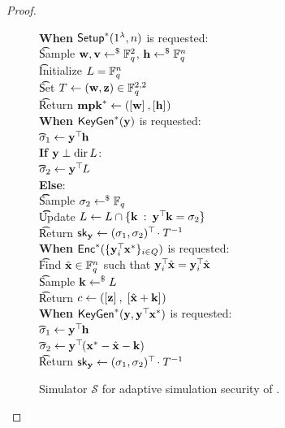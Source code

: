 \begin{proof}
	\begin{figure}[htb]
	\centering
	\begin{pcvstack}
		{
			\textbf{When} $\mathsf{Setup}^\ast(1^\lambda, n)$ is requested:
				\\
			\t Sample $\mathbf{w}, \mathbf{v} \gets^{\$} \mathbb{F}_q^2$, $\mathbf{h} \gets^{\$} \mathbb{F}_q^n$
				\qquad
				\\
			\t Initialize $L = \mathbb{F}_q^n$
				\qquad
				\\
			\t Set $T \gets (\mathbf{w}, \mathbf{z}) \in \mathbb{F}_q^{2,2}$
				\\
			\t Return $\mathbf{mpk}^\ast \gets \left( \left[{\mathbf{w}}\right]_{}, \left[{\mathbf{h}}\right]_{} \right)$
				\\[\pcmedskip]
			\textbf{When} $\mathsf{KeyGen}^\ast(\mathbf{y})$ is requested:
				\\
			\t $\sigma_1 \gets \mathbf{y}^\top\hspace{-.1em} \mathbf{h}$
				\qquad
				\\
			\t \textbf{If} $\mathbf{y} \perp {\mathrm{dir}}\, L$:
				\qquad
				\\
			\t\t $\sigma_2 \gets \mathbf{y}^\top\hspace{-.1em} L$
				\\
			\t \textbf{Else}:
				\\
			\t\t Sample $\sigma_2 \gets^{\$} \mathbb{F}_q$
				\\
			\t\t Update $L \gets L \cap \{ \mathbf{k} \: : \: \mathbf{y}^\top\hspace{-.1em} \mathbf{k} = \sigma_2\}$
				\\
			\t Return $\mathsf{sk}_{\mathbf{y}} \gets (\sigma_1, \sigma_2)^\top\hspace{-.1em} \cdot T^{-1}$
				\\[\pcmedskip]
			\textbf{When} $\mathsf{Enc}^\ast(\{\mathbf{y}_i^\top\hspace{-.1em} \mathbf{x}^\ast\}_{i \in Q})$ is requested:
				\\
			\t Find $\hat{\mathbf{x}} \in \mathbb{F}_q^n$ such that $\mathbf{y}_i^\top\hspace{-.1em} \hat{\mathbf{x}} = \mathbf{y}_i^\top\hspace{-.1em} \hat{\mathbf{x}}$
				\\
			\t Sample $\mathbf{k} \gets^{\$} L$
				\\
			\t Return $c \gets \left( \left[{\mathbf{z}}\right]_{}, \; \left[{\hat{\mathbf{x}} + \mathbf{k}}\right]_{} \right)$
				\\[\pcmedskip]
			\textbf{When} $\mathsf{KeyGen}^\ast(\mathbf{y}, \mathbf{y}^\top\hspace{-.1em} \mathbf{x}^\ast)$ is requested:
				\\
			\t $\sigma_1 \gets \mathbf{y}^\top\hspace{-.1em} \mathbf{h}$
				\\
			\t $\sigma_2 \gets \mathbf{y}^\top\hspace{-.1em} (\mathbf{x}^\ast - \hat{\mathbf{x}} - \mathbf{k})$
				\\
			\t Return $\mathsf{sk}_{\mathbf{y}} \gets (\sigma_1, \sigma_2)^\top\hspace{-.1em} \cdot T^{-1}$	
		}
	\end{pcvstack}
	\label{prot:AgrLibSth16:proof:simulator}
	\caption{Simulator $\mathcal{S}$ for adaptive simulation security of \cite{C:AgrLibSte16}.}
	\end{figure}
	

\end{proof}
